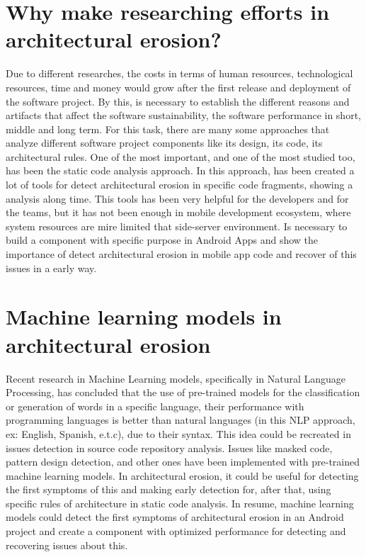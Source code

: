 \section{Why make researching efforts in architectural erosion?}
Due to different researches, the costs in terms of human resources, technological resources, time and money would grow after the first release and deployment of the software project. By this, is necessary to establish the different reasons and artifacts that affect the software sustainability, the software performance in short, middle and long term. For this task, there are many some approaches that analyze different software project components like its design, its code, its architectural rules. One of the most important, and one of the most studied too, has been the static code analysis approach. In this approach, has been created a lot of tools for detect architectural erosion in specific code fragments, showing a analysis along time. This tools has been very helpful for the developers and for the teams, but it has not been enough in mobile development ecosystem, where system resources are mire limited that side-server environment. Is necessary to build a component with specific purpose in Android Apps and show the importance of detect architectural erosion in mobile app code and recover of this issues in a early way.

\section{Machine learning models in architectural erosion}
Recent research in Machine Learning models, specifically in Natural Language Processing, has concluded that the use of pre-trained models for the classification or generation of words in a specific language, their performance with programming languages is better than natural languages (in this NLP approach, ex: English, Spanish, e.t.c), due to their syntax. This idea could be recreated in issues detection in source code repository analysis. Issues like masked code, pattern design detection, and other ones have been implemented with pre-trained machine learning models. In architectural erosion, it could be useful for detecting the first symptoms of this and making early detection for, after that, using specific rules of architecture in static code analysis. In resume,  machine learning models could detect the first symptoms of architectural erosion in an Android project and create a component with optimized performance for detecting and recovering issues about this.


\endinput

